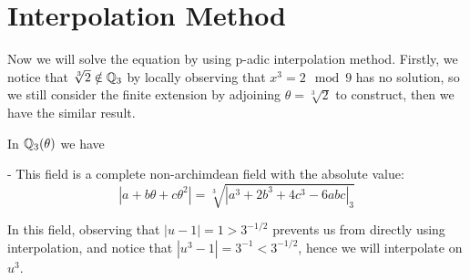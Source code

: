 \section{Interpolation Method}

Now we will solve the equation by using p-adic interpolation method. Firstly, we notice that \(\sqrt[3]{2} \notin \mathbb{Q}_3\) by locally observing that \(x^3 = 2 \mod 9\) has no solution, so we still consider the finite extension by adjoining \(\theta = \sqrt[3]{2}\) to construct, then we have the similar result.

\begin{proposition}
    In \(\mathbb{Q}_3 (\theta)\) we have

    - This field is a complete non-archimdean field with the absolute value:
    \[|a+b\theta+c\theta^2| = \sqrt[3]{|a^3+2b^3+4c^3-6abc|_3}\]
\end{proposition}

    In this field, observing that \(|u-1| =1 > 3^{-1/2}\) prevents us from directly using interpolation, and notice that \(|u^3-1| = 3^{-1} < 3^{-1/2}\), hence we will interpolate on \(u^3\).

